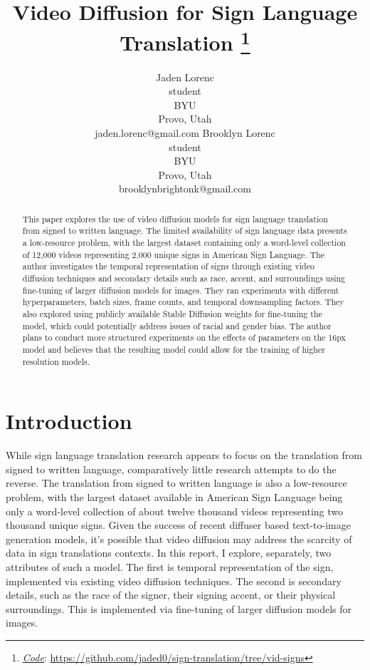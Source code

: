 \documentclass{article}
\title{Video Diffusion for Sign Language Translation
\thanks{\textit{\underline{Code}}: 
\url{https://github.com/jaded0/sign-translation/tree/vid-signs}} 
}
\author{
  Jaden Lorenc \\
  student \\
  BYU \\
  Provo, Utah\\
  jaden.lorenc@gmail.com
  \And 
  Brooklyn Lorenc \\
  student \\
  BYU \\
  Provo, Utah\\
  brooklynbrightonk@gmail.com
}
\begin{document}
\maketitle


\begin{abstract}
This paper explores the use of video diffusion models for sign language translation from signed to written language. The limited availability of sign language data presents a low-resource problem, with the largest dataset containing only a word-level collection of 12,000 videos representing 2,000 unique signs in American Sign Language. The author investigates the temporal representation of signs through existing video diffusion techniques and secondary details such as race, accent, and surroundings using fine-tuning of larger diffusion models for images. They ran experiments with different hyperparameters, batch sizes, frame counts, and temporal downsampling factors. They also explored using publicly available Stable Diffusion weights for fine-tuning the model, which could potentially address issues of racial and gender bias. The author plans to conduct more structured experiments on the effects of parameters on the 16px model and believes that the resulting model could allow for the training of higher resolution models.
\end{abstract}




\section{Introduction}
While sign language translation research appears to focus on the translation from signed to written language, comparatively little research attempts to do the reverse. The translation from signed to written language is also a low-resource problem, with the largest dataset available in American Sign Language being only a word-level collection of about twelve thousand videos representing two thousand unique signs. Given the success of recent diffuser based text-to-image generation models, it's possible that video diffusion may address the scarcity of data in sign translations contexts. In this report, I explore, separately, two attributes of such a model. The first is temporal representation of the sign, implemented via existing video diffusion techniques. The second is secondary details, such as the race of the signer, their signing accent, or their physical surroundings. This is implemented via fine-tuning of larger diffusion models for images.
\end{document}
